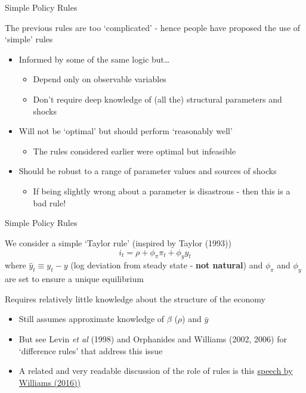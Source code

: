 \begin{frame}{Simple Policy Rules}

The previous rules are too `complicated' - hence people have proposed the use of `simple' rules
\vspace{2mm}
\begin{itemize}
\item	Informed by some of the same logic but\ldots
	\begin{itemize}
	\item	Depend only on observable variables
	\item	Don't require deep knowledge of (all the) structural parameters and shocks
	\end{itemize}
\vspace{2mm}	
\item	Will not be `optimal' but should perform `reasonably well'
	\begin{itemize}
	\item	The rules considered earlier were optimal but infeasible
	\end{itemize}
\vspace{2mm}
\item	Should be robust to a range of parameter values and sources of shocks
	\begin{itemize}
	\item	If being slightly wrong about a parameter is disastrous - then this is a bad rule!	
	\end{itemize}
\end{itemize}

\end{frame}


	
\begin{frame}{Simple Policy Rules}

We consider a simple `Taylor rule' (inspired by Taylor (1993))
\begin{equation}
i_{t} = \rho + \phi_{\pi} \pi_{t} + \phi_{y} \hat{y}_{t}
\end{equation}
where $\hat{y}_{t} \equiv y_{t} - y$ (log deviation from steady state - \textbf{not natural}) and $\phi_{\pi}$ and $\phi_{y}$ are set to ensure a unique equilibrium

\vspace{3mm}
Requires relatively little knowledge about the structure of the economy
\begin{itemize}
\item	Still assumes approximate knowledge of $\beta$ ($\rho$) and $\bar{y}$
\item	But see Levin \emph{et al} (1998) and Orphanides and Williams (2002, 2006) for `difference rules' that address this issue
\item	A related and very readable discussion of the role of rules is this \href{https://www.frbsf.org/economic-research/publications/economic-letter/2016/february/rules-of-engagement-monetary-policy-rules-speech/}{speech by Williams (2016))}
\end{itemize}

\end{frame}

